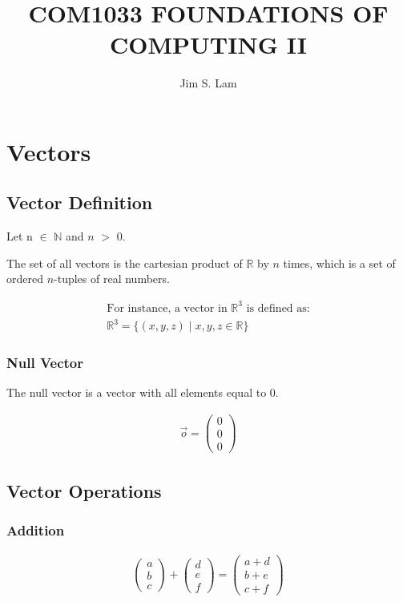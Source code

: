 \documentclass{article}
\author{Jim S. Lam}
\begin{document}
\title{COM1033 FOUNDATIONS OF COMPUTING II}
\maketitle
\tableofcontents
\pagebreak
\section{Vectors}
\subsection{Vector Definition}

Let n $\in$ $\mathbb{N}$ and $n$ $>$ 0.

The set of all vectors is the cartesian product of $\mathbb{R}$ by $n$ times, which is a set of ordered $n$-tuples of real numbers.

\begin{align*}
    \textrm{For instance, a vector in } \mathbb{R}^3 \textrm{ is defined as:} \\
    \mathbb{R}^3 = \{ (x, y, z) \mid x, y, z \in \mathbb{R} \}
\end{align*}

\subsubsection*{Null Vector}

The null vector is a vector with all elements equal to 0.

\begin{align*}
    \vec{o} = \begin{pmatrix} 0 \\ 0 \\ 0 \end{pmatrix}
\end{align*}

\subsection{Vector Operations}
\subsubsection{Addition}
\begin{align*}
    \begin{pmatrix} a \\ b \\ c \end{pmatrix} + \begin{pmatrix} d \\ e \\ f \end{pmatrix} = \begin{pmatrix} a + d \\ b + e \\ c + f \end{pmatrix}
\end{align*}
\end{document}
